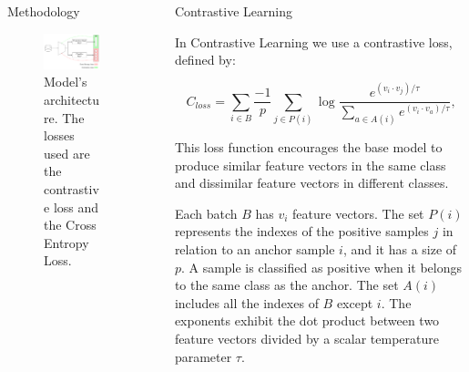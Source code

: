 \documentclass[final]{beamer}
\newlength{\sepwidth}
\newlength{\colwidth}
\newcommand{\separatorcolumn}{\begin{column}{\sepwidth}\end{column}}
\begin{document}
\begin{frame}[t]
\begin{columns}[t]
\begin{column}{\colwidth}
\begin{block}{Methodology}
    \begin{figure}[!ht]
      \centering
      \includegraphics[width=\textwidth]{img/architecture.png}
      \caption{Model's architecture. The losses used are the contrastive loss and the Cross Entropy Loss. \label{fig:multi_loss}}
    \end{figure} 

  \end{block}

\end{column}

\separatorcolumn

\begin{column}{\colwidth}

  \begin{exampleblock}{Contrastive Learning}

    In Contrastive Learning we use a contrastive loss, defined by:

    \begin{equation}
      C_{loss} = \sum_{i \in B} \frac{-1}{p} \sum_{j \in P(i)} \log \frac{e^{(v_i \cdot v_j) / \tau}}{\sum\limits_{a \in A(i)} e^{(v_i \cdot v_a) / \tau}}
      \label{eq:con_loss}\text{,}
    \end{equation}

    This loss function encourages the base model to produce
    similar feature vectors in the same class and dissimilar feature vectors in 
    different classes.


    Each batch $B$ has $v_i$ feature vectors. The set $P(i)$ 
    represents the indexes of the positive samples $j$ in relation to an anchor 
    sample $i$, and it has a size of $p$. A sample is classified as positive when 
    it belongs to the same class as the anchor. The set $A(i)$ includes all
    the indexes of $B$ except $i$. The exponents exhibit the dot product between 
    two feature vectors divided by a scalar temperature parameter $\tau$.


\end{exampleblock}
\end{column}
\end{columns}
\end{frame}
\end{document}
